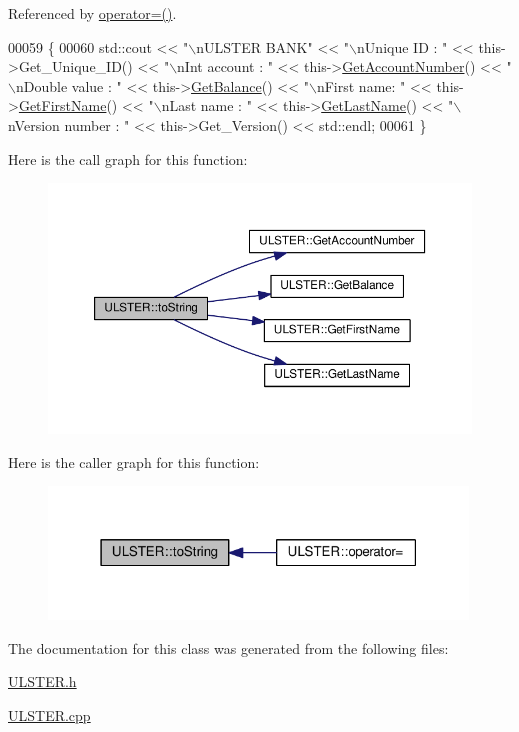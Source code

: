 Referenced by \hyperlink{_u_l_s_t_e_r_8h_source_l00062}{operator=()}.


\begin{DoxyCode}
00059 \{
00060    std::cout << \textcolor{stringliteral}{"\(\backslash\)nULSTER BANK"} << \textcolor{stringliteral}{"\(\backslash\)nUnique ID : "} << this->Get\_Unique\_ID() << \textcolor{stringliteral}{"\(\backslash\)nInt account : "} << 
      this->\hyperlink{class_u_l_s_t_e_r_a1ad672ae865a9f559bf4d3c33c243d63}{GetAccountNumber}() << \textcolor{stringliteral}{"\(\backslash\)nDouble value : "} << this->\hyperlink{class_u_l_s_t_e_r_ae70da9686ac038862900182a984e56eb}{GetBalance}() << \textcolor{stringliteral}{"\(\backslash\)nFirst name:
       "} << this->\hyperlink{class_u_l_s_t_e_r_a85ee4e42d9b309608d8dfbedac65ff27}{GetFirstName}() << \textcolor{stringliteral}{"\(\backslash\)nLast name : "} << this->\hyperlink{class_u_l_s_t_e_r_a9320b012bccda4ebf6b41c9ed972743c}{GetLastName}()  << \textcolor{stringliteral}{"\(\backslash\)nVersion
       number : "} << this->Get\_Version() << std::endl;
00061 \}
\end{DoxyCode}


Here is the call graph for this function\+:\nopagebreak
\begin{figure}[H]
\begin{center}
\leavevmode
\includegraphics[width=350pt]{class_u_l_s_t_e_r_a341bbcb3f7d6ef10f30d4734ceed10ee_cgraph}
\end{center}
\end{figure}




Here is the caller graph for this function\+:\nopagebreak
\begin{figure}[H]
\begin{center}
\leavevmode
\includegraphics[width=316pt]{class_u_l_s_t_e_r_a341bbcb3f7d6ef10f30d4734ceed10ee_icgraph}
\end{center}
\end{figure}




The documentation for this class was generated from the following files\+:\begin{DoxyCompactItemize}
\item 
\hyperlink{_u_l_s_t_e_r_8h}{U\+L\+S\+T\+E\+R.\+h}\item 
\hyperlink{_u_l_s_t_e_r_8cpp}{U\+L\+S\+T\+E\+R.\+cpp}\end{DoxyCompactItemize}
